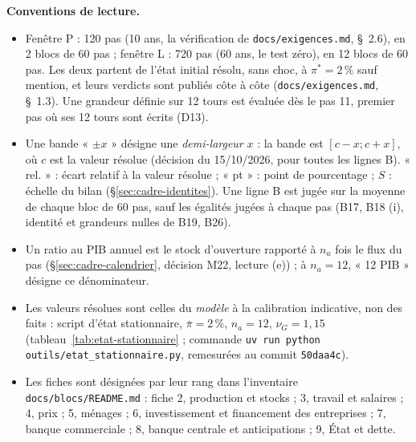 \documentclass[11pt,a4paper]{article}
\begin{document}
\begin{proposee}
\textbf{Conventions de lecture.}
\begin{itemize}
\item Fenêtre P : 120 pas (10 ans, la vérification de \nolinkurl{docs/exigences.md}, \S~2.6), en 2 blocs de 60 pas ; fenêtre L : 720 pas (60 ans, le test zéro), en 12 blocs de 60 pas. Les deux partent de l'état initial résolu, sans choc, à $\pi^\ast = 2\,\%$ sauf mention, et leurs verdicts sont publiés côte à côte (\nolinkurl{docs/exigences.md}, \S~1.3). Une grandeur définie sur 12 tours est évaluée dès le pas 11, premier pas où ses 12 tours sont écrits (D13).
\item Une bande « $\pm x$ » désigne une \emph{demi-largeur} $x$ : la bande est $[c - x ; c + x]$, où $c$ est la valeur résolue (décision du 15/10/2026, pour toutes les lignes B). « rel. » : écart relatif à la valeur résolue ; « pt » : point de pourcentage ; $S$ : échelle du bilan (\S\ref{sec:cadre-identites}). Une ligne B est jugée sur la moyenne de chaque bloc de 60 pas, sauf les égalités jugées à chaque pas (B17, B18 (i), identité et grandeurs nulles de B19, B26).
\item Un ratio au PIB annuel est le stock d'ouverture rapporté à $n_a$ fois le flux du pas (\S\ref{sec:cadre-calendrier}, décision M22, lecture (e)) ; à $n_a = 12$, « 12 PIB » désigne ce dénominateur.
\item Les valeurs résolues sont celles du \emph{modèle} à la calibration indicative, non des faits : script d'état stationnaire, $\bar\pi = 2\,\%$, $n_a = 12$, $\nu_G = 1{,}15$ (tableau~\ref{tab:etat-stationnaire} ; commande \texttt{uv run python outils/etat\_stationnaire.py}, remesurées au commit \texttt{50daa4c}).
\item Les fiches sont désignées par leur rang dans l'inventaire \nolinkurl{docs/blocs/README.md} : fiche 2, production et stocks ; 3, travail et salaires ; 4, prix ; 5, ménages ; 6, investissement et financement des entreprises ; 7, banque commerciale ; 8, banque centrale et anticipations ; 9, État et dette.
\end{itemize}


\end{proposee}
\end{document}
